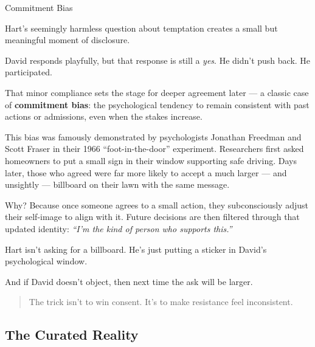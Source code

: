 \begin{PsychologicalSidebar}{Commitment Bias}

    Hart's seemingly harmless question about temptation creates a small but meaningful moment of disclosure.

    \medskip
    
    David responds playfully, but that response is still a \textit{yes}.  
    He didn’t push back. He participated.

    \medskip
    
    
    That minor compliance sets the stage for deeper agreement later — a classic case of \textbf{commitment bias}: 
    the psychological tendency to remain consistent with past actions or admissions, even when the stakes increase.
    
    \medskip
    
    This bias was famously demonstrated by psychologists Jonathan Freedman and Scott Fraser in their 1966 “foot-in-the-door” 
    experiment. Researchers first asked homeowners to put a small sign in their window supporting safe driving. Days later, 
    those who agreed were far more likely to accept a much larger — and unsightly — billboard on their lawn with the same message.

    \medskip
    
    
    Why? Because once someone agrees to a small action, they subconsciously adjust their self-image to align with it.  
    Future decisions are then filtered through that updated identity: \textit{“I’m the kind of person who supports this.”}
    
    \medskip
    
    Hart isn’t asking for a billboard. He’s just putting a sticker in David’s psychological window.

    \medskip
    
    
    And if David doesn’t object, then next time the ask will be larger.
    
    \begin{quote}
    The trick isn’t to win consent.  
    It’s to make resistance feel inconsistent.
    \end{quote}
    
\end{PsychologicalSidebar}
    



\subsection{The Curated Reality}


